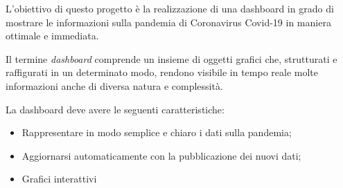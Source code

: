 
\noindent L’obiettivo di questo progetto è la realizzazione di una dashboard in grado di mostrare le informazioni sulla pandemia di Coronavirus Covid-19 in maniera ottimale e immediata.


\noindent Il termine \emph{dashboard} comprende un insieme di oggetti grafici che, strutturati e raffigurati in un determinato modo, rendono visibile in tempo reale molte informazioni anche di diversa natura e complessità. 

\noindent La dashboard deve avere le seguenti caratteristiche:

\begin{itemize}
    \item Rappresentare in modo semplice e chiaro i dati sulla pandemia;
    \item Aggiornarsi automaticamente con la pubblicazione dei nuovi dati;
    \item Grafici interattivi
\end{itemize}
